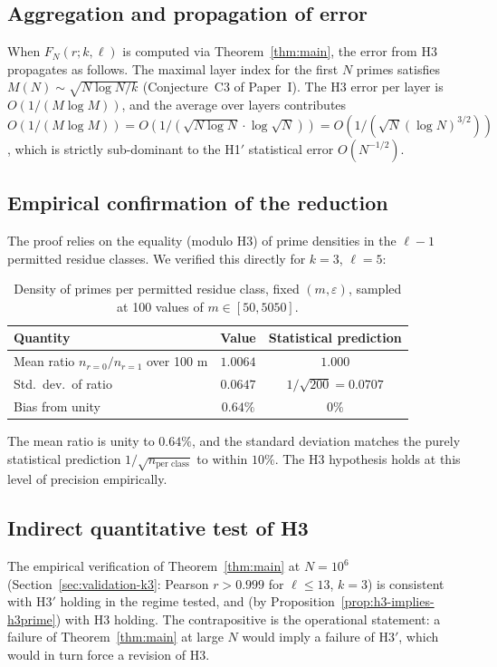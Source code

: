 \documentclass[11pt,a4paper]{article}
\theoremstyle{plain}
\theoremstyle{definition}
\newcommand{\eps}{\varepsilon}
\begin{document}
\subsection{Aggregation and propagation of error}

When $F_N(r; k, \ell)$ is computed via Theorem~\ref{thm:main}, the error from
H3 propagates as follows. The maximal layer index for the first $N$ primes
satisfies $M(N) \sim \sqrt{N \log N / k}$ (Conjecture~C3 of Paper~I). The H3
error per layer is $O(1/(M \log M))$, and the average over layers contributes
$O(1/(M \log M)) = O(1/(\sqrt{N \log N} \cdot \log\sqrt{N})) = O(1/(\sqrt{N}
(\log N)^{3/2}))$, which is strictly sub-dominant to the H1$'$ statistical
error $O(N^{-1/2})$.

\subsection{Empirical confirmation of the reduction}

The proof relies on the equality (modulo H3) of prime densities in the $\ell-1$
permitted residue classes. We verified this directly for $k = 3$, $\ell = 5$:

\begin{table}[h!]
\centering
\caption{Density of primes per permitted residue class, fixed $(m, \eps)$,
sampled at 100 values of $m \in [50, 5050]$.}
\begin{tabular}{l c c}
\toprule
Quantity & Value & Statistical prediction \\
\midrule
Mean ratio $n_{r=0} / n_{r=1}$ over 100 m & $1.0064$ & $1.000$ \\
Std.\ dev.\ of ratio & $0.0647$ & $1/\sqrt{200} = 0.0707$ \\
Bias from unity & $0.64\%$ & $0\%$ \\
\bottomrule
\end{tabular}
\end{table}

The mean ratio is unity to $0.64\%$, and the standard deviation matches the
purely statistical prediction $1/\sqrt{n_{\text{per class}}}$ to within $10\%$.
The H3 hypothesis holds at this level of precision empirically.

\subsection{Indirect quantitative test of H3}

The empirical verification of Theorem~\ref{thm:main} at $N = 10^6$
(Section~\ref{sec:validation-k3}: Pearson $r > 0.999$ for $\ell \le 13$,
$k = 3$) is consistent with H3$'$ holding in the regime tested, and (by
Proposition~\ref{prop:h3-implies-h3prime}) with H3 holding. The contrapositive
is the operational statement: a failure of Theorem~\ref{thm:main} at large
$N$ would imply a failure of H3$'$, which would in turn force a revision of
H3.
\end{document}
